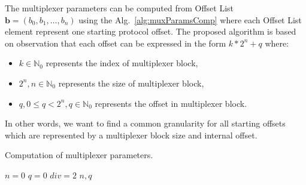 The multiplexer parameters can be computed from Offset List $\textbf{b}=(b_0,b_1,\dots,b_n)$ 
using the Alg.~\ref{alg:muxParamsComp} where each Offset List element represent one starting protocol offset. 
The proposed algorithm is based on observation that each offset can be expressed in the form $k*2^n + q$ where:
\begin{itemize}
    \item  $k \in {\mathbb N_0}$ represents the index of multiplexer block,
    \item  $2^n, n \in {\mathbb N_0}$ represents the size of multiplexer block,
    \item  $q, 0 \leq q < 2^n, q \in {\mathbb N_0}$ represents the offset in multiplexer block.
\end{itemize}

In other words, we want to find a common granularity for all starting offsets which are represented by a multiplexer block 
size and internal offset.

\begin{algorithm}[!b]
    \caption{Computation of multiplexer parameters.}
    \SetAlgoLined
    \label{alg:muxParamsComp}
            \BlankLine
    $n = 0$\;
    $q = 0$\;
    $div = 2$\;
    \BlankLine
    \BlankLine
    \Return $n,q$
\end{algorithm}

